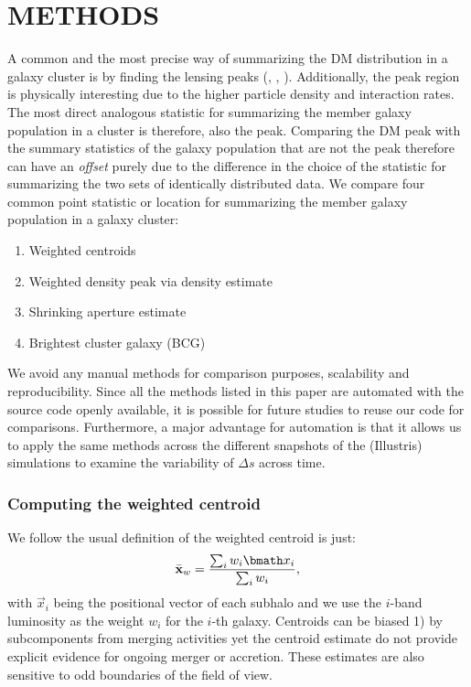 \section{METHODS}\label{sec:methods}
A common and the most precise way of summarizing the DM distribution in a
galaxy cluster is by finding the lensing peaks 
(\citealt{Medezinski2013}, \citealt{Markevitch2004}, \citealt{Zitrin13}).
Additionally, the peak region is physically 
interesting due to the higher particle density and interaction rates. 
The most direct analogous statistic for summarizing the member galaxy
population in a cluster is therefore, also the peak. 
Comparing the DM peak with the summary statistics of the galaxy population that
are not the peak therefore can have an {\it offset} purely due to the difference in
the choice of the statistic for summarizing the two sets of identically
distributed data. 
We compare four common point statistic or location for summarizing 
the member galaxy population in a galaxy cluster:
\begin{enumerate}
\item Weighted centroids
\item Weighted density peak via density estimate  
\item Shrinking aperture estimate
\item Brightest cluster galaxy (BCG)
\end{enumerate}

We avoid any manual methods for
comparison purposes, scalability and reproducibility. 
Since all the methods listed in this
paper are automated with the source code openly available, 
it is possible for future studies to reuse our code for comparisons. 
Furthermore, a major advantage for automation is that it allows us  
to apply
the same methods across the different snapshots of the (Illustris) simulations to
examine the variability of $\Delta s$ across time. 


\subsubsection{Computing the weighted centroid}
\label{subsubsec:weighted_centroid}
We follow the usual definition of the weighted centroid is just: 
\begin{equation}
	\bar{\bf x}_w = \frac{\sum_i w_i \vec{x}_i}{\sum_i w_i},
\end{equation}
with $\vec{x}_i$ being the positional vector of each subhalo 
and we use the $i$-band luminosity 
as the weight $w_i$ for the $i$-th galaxy.
Centroids can be biased 1) by subcomponents from merging activities yet the
centroid estimate do not provide explicit evidence for ongoing merger or 
accretion. These estimates are also sensitive to odd boundaries 
of the field of view.

